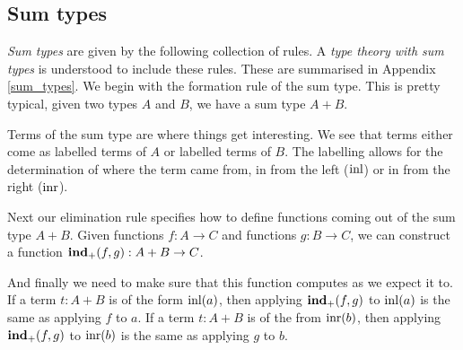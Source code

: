 \subsection{Sum types}

\begin{defin}
    \emph{Sum types} are given by the following collection of rules. A \emph{type theory with sum types} is understood to include these rules. These are summarised in Appendix \ref{sum_types}. 
    We begin with the formation rule of the sum type. This is pretty typical, given two types $A$ and $B$, we have a sum type $A + B$.
    \begin{prooftree}
    \end{prooftree}

    Terms of the sum type are where things get interesting. We see that terms either come as labelled terms of $A$ or labelled terms of $B$. The labelling allows for the determination of where the term came from, in from the left ($\inl$) or in from the right ($\inr$).

    \begin{prooftree}
    \end{prooftree}

    \begin{prooftree}
    \end{prooftree}

    Next our elimination rule specifies how to define functions coming out of the sum type $A + B$. Given functions $f : A \to C$ and functions $g : B \to C$, we can construct a function $\indp(f,g) : A + B \to C$.

    \begin{prooftree}
    \end{prooftree}

    And finally we need to make sure that this function computes as we expect it to. If a term $t : A + B$ is of the form $\inl(a)$, then applying $\indp(f, g)$ to $\inl(a)$ is the same as applying $f$ to $a$. If a term $t : A + B$ is of the from $\inr(b)$, then applying $\indp (f, g)$ to $\inr (b)$ is the same as applying $g$ to $b$.


\end{defin}
